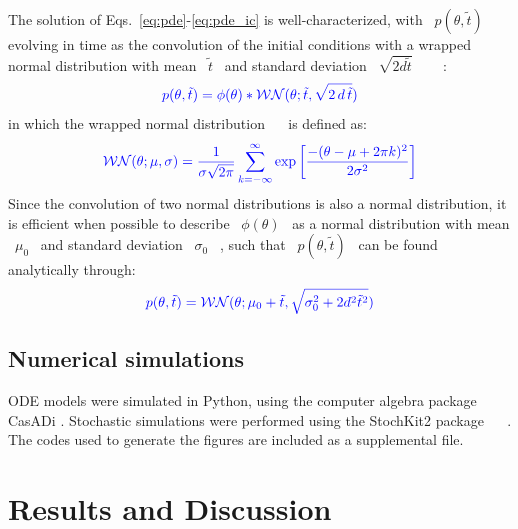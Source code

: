 \documentclass[11pt, letterpaper]{article}
\providecommand{\DIFadd}[1]{{\protect\color{blue}#1}} %
\providecommand{\DIFaddbegin}{} %
\providecommand{\DIFaddend}{} %
\begin{document}
\DIFadd{The solution of Eqs.~\ref{eq:pde}-\ref{eq:pde_ic} is well-characterized, with \mbox{%
$p(\theta, \tilde{t})$
}%
evolving in time as the convolution of the initial conditions with a wrapped normal distribution with mean \mbox{%
$\tilde{t}$
}%
and standard deviation \mbox{%
$\sqrt{2d\tilde{t}}$
}%
\mbox{%
\cite{Chirikjian2009}
}%
:
}\begin{equation}\DIFadd{
  p(\theta, \tilde{t}) = \phi(\theta) * \mathcal{WN}(\theta; \tilde{t},
  \sqrt{2\, d\, \tilde{t}})
}\end{equation}
\DIFadd{in which the wrapped normal distribution \mbox{%
\cite{Mardia2009}
}%
is defined as:
}\begin{equation}\DIFadd{
  {\cal WN}}\DIFadd{(\theta; \mu, \sigma) =
  \frac{1}{\sigma\sqrt{2\pi}}\sum_{k=-\infty}^\infty \exp\left[\frac{-(\theta
  - \mu + 2\pi k)^2}{2\sigma^2}\right]
  \label{eq:wrapped_normal}
}\end{equation}
\DIFadd{Since the convolution of two normal distributions is also a normal distribution, it is efficient when possible to describe \mbox{%
$\phi(\theta)$
}%
as a normal distribution with mean \mbox{%
$\mu_0$
}%
and standard deviation \mbox{%
$\sigma_0$
}%
, such that \mbox{%
$p(\theta, \tilde{t})$
}%
can be found analytically through:
}\begin{equation}\DIFadd{
  p(\theta, \tilde{t}) = \mathcal{WN}(\theta; \mu_0 + \tilde{t},
  \sqrt{\sigma_0^2 + 2d^2\tilde{t}^2})
}\end{equation}
\DIFaddend 


\subsection*{Numerical simulations}
\DIFaddbegin 

\DIFaddend ODE models were simulated in Python, using the computer algebra package CasADi \cite{Andersson2013b}.
\DIFaddbegin \DIFadd{Stochastic simulations were performed using the StochKit2 package \mbox{%
\cite{Sanft2011a}
}%
.
}\DIFaddend The codes used to generate the figures are included as a supplemental file.

\section*{Results and Discussion}
\DIFaddbegin 
\end{document}
